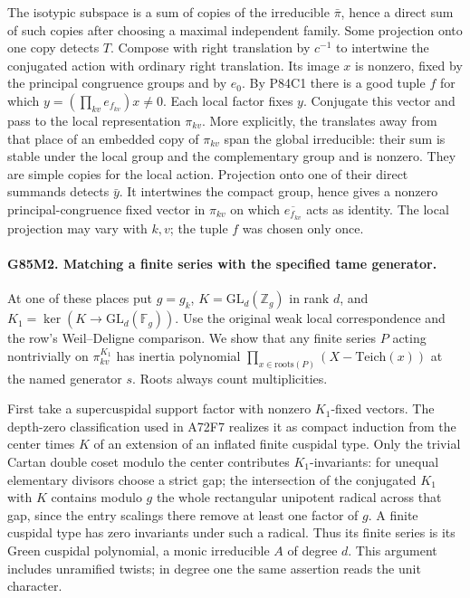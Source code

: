 The isotypic subspace is a sum of copies of the irreducible
$\bar\pi$, hence a direct sum of such copies after choosing a
maximal independent family. Some projection onto one copy detects
$T$. Compose with right translation by $c^{-1}$ to intertwine the
conjugated action with ordinary right translation. Its image $x$
is nonzero, fixed by the principal congruence groups and by $e_0$.
By P84C1 there is a good tuple $f$ for which
$y=(\prod_{kv}e_{f_{kv}})x\ne0$. Each local factor fixes $y$.
Conjugate this vector and pass to the local representation
$\pi_{kv}$. More explicitly, the translates away from that place
of an embedded copy of $\pi_{kv}$ span the global irreducible:
their sum is stable under the local group and the complementary
group and is nonzero. They are simple copies for the local action.
Projection onto one of their direct summands detects $\bar y$.
It intertwines the compact group, hence gives a nonzero
principal-congruence fixed vector in $\pi_{kv}$ on which
$\overline{e_{f_{kv}}}$ acts as identity. The local projection may
vary with $k,v$; the tuple $f$ was chosen only once.

\paragraph{G85M2. Matching a finite series with the specified tame generator.}
At one of these places put $g=g_k$, $K=\mathrm{GL}_d(\mathbb Z_g)$
in rank $d$, and $K_1=\ker(K\to\mathrm{GL}_d(\mathbb F_g))$.
Use the original weak local correspondence and the row's
Weil--Deligne comparison. We show that any finite series $P$ acting
nontrivially on $\pi_{kv}^{K_1}$ has inertia polynomial
$\prod_{x\in\mathrm{roots}(P)}(X-\mathrm{Teich}(x))$ at
the named generator $s$. Roots always count multiplicities.

First take a supercuspidal support factor with nonzero
$K_1$-fixed vectors. The depth-zero classification used in A72F7
realizes it as compact induction from the center times $K$ of an
extension of an inflated finite cuspidal type. Only the trivial
Cartan double coset modulo the center contributes $K_1$-invariants:
for unequal elementary divisors choose a strict gap; the
intersection of the conjugated $K_1$ with $K$ contains modulo $g$
the whole rectangular unipotent radical across that gap, since the
entry scalings there remove at least one factor of $g$.
A finite cuspidal type has zero invariants under such a radical.
Thus its finite series is its Green cuspidal polynomial, a monic
irreducible $A$ of degree $d$. This argument includes unramified
twists; in degree one the same assertion reads the unit character.

